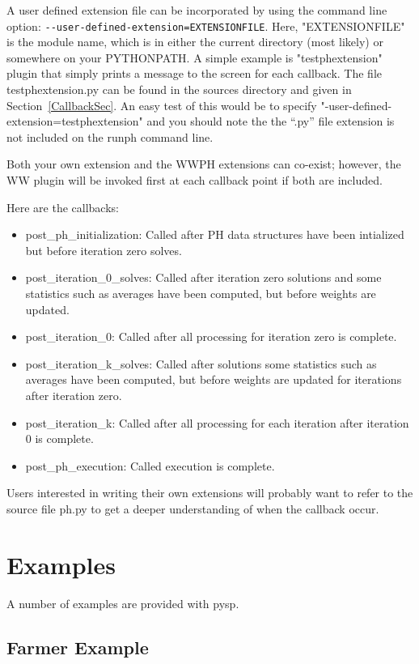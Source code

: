 A user defined extension file can be incorporated by using the command line option: 
\verb|--user-defined-extension=EXTENSIONFILE|. Here, "EXTENSIONFILE" is the module name, which is in either the current directory (most likely) or somewhere on your PYTHONPATH. A simple example is "testphextension" plugin that simply prints a message to the screen for each callback. The file testphextension.py can be found in the sources directory and given in Section~\ref{CallbackSec}. An easy test of this would be to specify "-user-defined-extension=testphextension" and you should
note the the ``.py'' file extension is not included on the runph command line. 
 
Both your own extension and the WWPH extensions can co-exist; however, the WW plugin will be invoked first at each callback point if both are included.

Here are the callbacks:
\begin{itemize}
\item post\_ph\_initialization: Called after PH data structures have been intialized but before iteration zero solves.
\item post\_iteration\_0\_solves: Called after iteration zero solutions and some statistics such as averages have been computed, but before weights are updated.
\item post\_iteration\_0: Called after all processing for iteration zero is complete.
\item post\_iteration\_k\_solves: Called after solutions some statistics such as averages have been computed, but before weights are updated for iterations after iteration zero.
\item post\_iteration\_k: Called after all processing for each iteration after iteration 0 is complete.
\item post\_ph\_execution: Called execution is complete.
\end{itemize}

Users interested in writing their own extensions will probably want to refer to the source file ph.py to get a deeper understanding of when the callback occur.

\section{Examples \label{ExampleSec}}

A number of examples are provided with pysp.

\subsection{Farmer Example}

